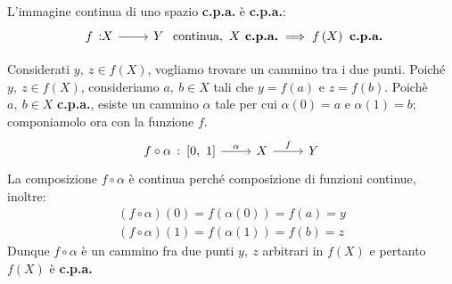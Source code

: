\begin{theorema}~{}\\
L'immagine continua di uno spazio \textbf{c.p.a.} è \textbf{c.p.a.}:
	\begin{equation}
		\funz{f}{X}{Y}\text{ continua},\ X\textbf{ c.p.a.}\implies f\left(X\right)\textbf{ c.p.a.}
		\end{equation}
		\vspace{-6mm}
	\end{theorema}
\begin{demonstration}
	Considerati $y,\ z\in f\left(X\right)$, vogliamo trovare un cammino tra i due punti. Poiché $y,\ z\in f\left(X\right)$, consideriamo $a,\ b\in X$ tali che $y=f(a)$ e $z=f(b)$. Poichè $a,\ b\in X$ \textbf{c.p.a.}, esiste un cammino $\alpha$ tale per cui $\alpha\left(0\right)=a$ e $\alpha\left(1\right)=b$; componiamolo ora con la funzione $f$.
\[
\begin{tikzcd}
	{f\circ \alpha\ \colon \left[0,\ 1\right]} \arrow[r, "\alpha"] & X \arrow[r, "f"] & Y
\end{tikzcd}
\]
La composizione $f\circ \alpha$ è continua perché composizione di funzioni continue, inoltre:
\begin{gather*}
	\left(f\circ \alpha\right)\left(0\right)=f\left(\alpha\left(0\right)\right)=f\left(a\right)=y\\
	\left(f\circ \alpha\right)\left(1\right)=f\left(\alpha\left(1\right)\right)=f\left(b\right)=z
\end{gather*}
Dunque $f\circ \alpha$ è un cammino fra due punti $y,\ z$ arbitrari in $f\left(X\right)$ e pertanto $f\left(X\right)$ è \textbf{c.p.a.}
\end{demonstration}
